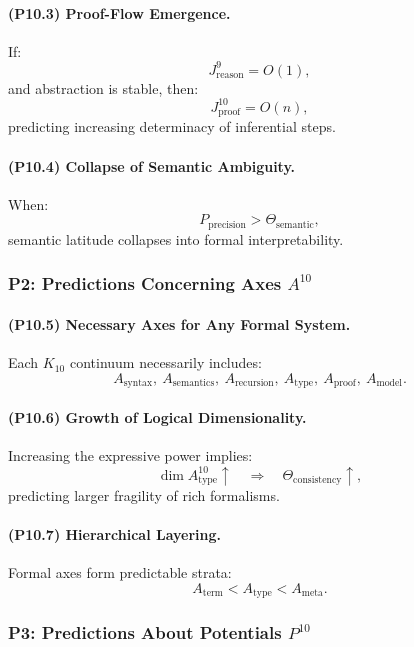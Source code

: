 \paragraph{(P10.3) Proof-Flow Emergence.}
If:
\[
J_{\mathrm{reason}}^{9} = O(1),
\]
and abstraction is stable, then:
\[
J_{\mathrm{proof}}^{10} = O(n),
\]
predicting increasing determinacy of inferential steps.

\paragraph{(P10.4) Collapse of Semantic Ambiguity.}
When:
\[
P_{\mathrm{precision}} > \Theta_{\mathrm{semantic}},
\]
semantic latitude collapses into formal interpretability.

\subsubsection{P2: Predictions Concerning Axes $A^{10}$}

\paragraph{(P10.5) Necessary Axes for Any Formal System.}
Each $K_{10}$ continuum necessarily includes:
\[
A_{\mathrm{syntax}},\
A_{\mathrm{semantics}},\
A_{\mathrm{recursion}},\
A_{\mathrm{type}},\
A_{\mathrm{proof}},\
A_{\mathrm{model}}.
\]

\paragraph{(P10.6) Growth of Logical Dimensionality.}
Increasing the expressive power implies:
\[
\dim A_{\mathrm{type}}^{10} \uparrow \quad 
\Rightarrow \quad 
\Theta_{\mathrm{consistency}} \uparrow,
\]
predicting larger fragility of rich formalisms.

\paragraph{(P10.7) Hierarchical Layering.}
Formal axes form predictable strata:
\[
A_{\mathrm{term}} < A_{\mathrm{type}} < A_{\mathrm{meta}}.
\]

\subsubsection{P3: Predictions About Potentials $P^{10}$}

